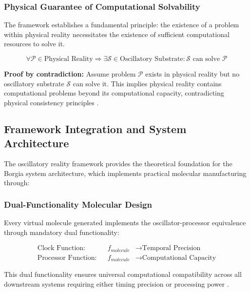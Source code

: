 \subsubsection{Physical Guarantee of Computational Solvability}

The framework establishes a fundamental principle: the existence of a problem within physical reality necessitates the existence of sufficient computational resources to solve it.

\begin{theorem}
\begin{equation}
\forall \mathcal{P} \in \text{Physical Reality} \Rightarrow \exists \mathcal{S} \in \text{Oscillatory Substrate} : \mathcal{S} \text{ can solve } \mathcal{P}
\end{equation}
\end{theorem}

\textbf{Proof by contradiction:} Assume problem $\mathcal{P}$ exists in physical reality but no oscillatory substrate $\mathcal{S}$ can solve it. This implies physical reality contains computational problems beyond its computational capacity, contradicting physical consistency principles \cite{lloyd2000ultimate,sterling2015principles}.

\subsection{Framework Integration and System Architecture}

The oscillatory reality framework provides the theoretical foundation for the Borgia system architecture, which implements practical molecular manufacturing through:

\subsubsection{Dual-Functionality Molecular Design}

Every virtual molecule generated implements the oscillator-processor equivalence through mandatory dual functionality:

\begin{align}
\text{Clock Function}: &&f_{molecule} &\rightarrow \text{Temporal Precision} \\
\text{Processor Function}: &&f_{molecule} &\rightarrow \text{Computational Capacity}
\end{align}

This dual functionality ensures universal computational compatibility across all downstream systems requiring either timing precision or processing power \cite{sterling2015principles}.

